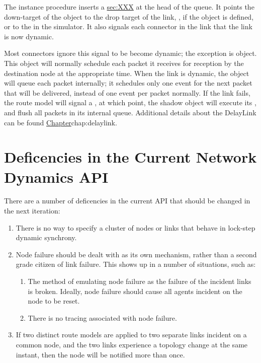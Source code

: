 The instance procedure  inserts a 
\href{DynamicLink object}{sec:XXX} at the head of the queue.
It points the down-target of the object to the 
drop target of the link, , if the object is defined,
or to the  in the simulator.
It also signals each connector in the link that the link is now
dynamic.

Most connectors ignore this signal to be become dynamic;
the exception is  object.
This object will normally schedule each packet it receives
for reception by the destination node at the appropriate time.
When the link is dynamic, the object will queue each packet 
internally; it schedules only one event for the next packet
that will be delivered, instead of one event per packet normally.
If the link fails, the route model will signal a ,
at which point, the shadow object will execute its
,
and flush all packets in its internal queue.
Additional details about the DelayLink can be found
\href{in another chapter}{Chapter}{chap:delaylink}.

\section{Deficencies in the Current Network Dynamics API}
\label{sec:deficiencies}

There are a number of deficencies in the current API that should be
changed in the next iteration:
\begin{enumerate}
\item  There is no way to specify a cluster of nodes or links that
behave in lock-step dynamic synchrony.
\item  Node failure should be dealt with as its own mechanism,
rather than a second grade citizen of link failure.
This shows up in a number of situations, such as:
\begin{enumerate}
\item  The method of emulating node failure as the failure of the
incident links is broken.  Ideally, node failure should cause all
agents incident on the node to be reset.
\item  There is no tracing associated with node failure.
\end{enumerate}
\item  If two distinct route models are applied to two separate links
incident on a common node, and the two links experience a topology change
at the same instant, then the node will be notified more than once.
\end{enumerate}

\endinput

### Local Variables:
### mode: latex
### comment-column: 60
### backup-by-copying-when-linked: t
### file-precious-flag: nil
### End:
